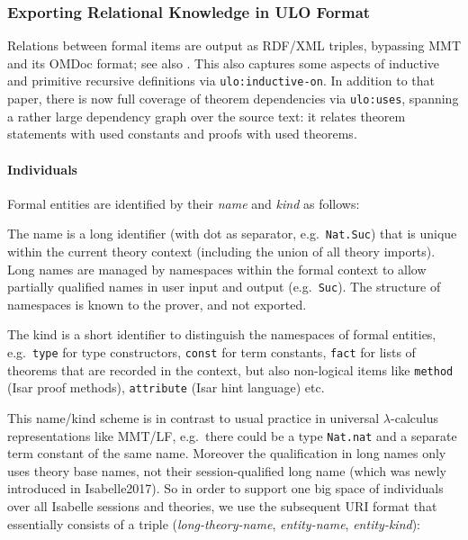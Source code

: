 \subsubsection{Exporting Relational Knowledge in ULO Format}

Relations between formal items are output as RDF/XML triples,
  bypassing MMT and its OMDoc format; see also
  \cite[\S3.1]{ConKohMue:rdaml19}.  This also captures some aspects of
  inductive and primitive recursive definitions via
  \verb,ulo:inductive-on,. In addition to that paper, there is now
  full coverage of theorem dependencies via \verb,ulo:uses,, spanning
  a rather large dependency graph over the source text: it relates
  theorem statements with used constants and proofs with used
  theorems.  



\paragraph{Individuals}
Formal entities are identified by their \emph{name} and \emph{kind} as follows:
\begin{compactitem}
\item The name is a long identifier (with dot as separator, e.g.\ \texttt{Nat.Suc}) that is unique within the current theory context (including the union of all theory imports). Long names are managed by namespaces within the formal context to allow partially qualified names in user input and output (e.g.\ \texttt{Suc}). The structure of namespaces is known to the prover, and not exported.
\item The kind is a short identifier to distinguish the namespaces of formal entities, e.g.\ \texttt{type} for type constructors, \texttt{const} for term constants, \texttt{fact} for lists of theorems that are recorded in the context, but also non-logical items like \texttt{method} (Isar proof methods), \texttt{attribute} (Isar hint language) etc.
\end{compactitem}

\noindent
This name/kind scheme is in contrast to usual practice in universal $\lambda$-calculus representations like MMT/LF, e.g.\ there could be a type \texttt{Nat.nat} and a separate term constant of the same name.  Moreover the qualification in long names only uses theory base names, not their session-qualified long name (which was newly introduced in Isabelle2017). So in order to support one big space of individuals over all Isabelle sessions and theories, we use the subsequent URI format that essentially consists of a triple (\emph{long-theory-name}, \emph{entity-name}, \emph{entity-kind}):

